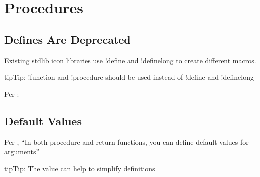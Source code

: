 \documentclass[letterpaper,10pt,english]{sphinxmanual}
\begin{document}
\section{Procedures}
\label{\detokenize{procedures/procedures:procedures}}\label{\detokenize{procedures/procedures:procedures-label}}\label{\detokenize{procedures/procedures::doc}}

\subsection{Defines Are Deprecated}
\label{\detokenize{procedures/procedures:defines-are-deprecated}}
Existing stdlib icon libraries use !define and !definelong to create different macros.

\begin{sphinxadmonition}{tip}{Tip:}
!function and !procedure should be used instead of !define and !definelong

Per :
\begin{quote}



\end{quote}
\end{sphinxadmonition}


\subsection{Default Values}
\label{\detokenize{procedures/procedures:default-values}}
Per , “In both procedure and return functions, you can define default values for arguments”

\begin{sphinxadmonition}{tip}{Tip:}
The  value can help to simplify definitions
\end{sphinxadmonition}

\begin{figure}[htbp]
\centering
\capstart

\caption{}\label{\detokenize{procedures/procedures:id1}}\end{figure}
\end{document}
